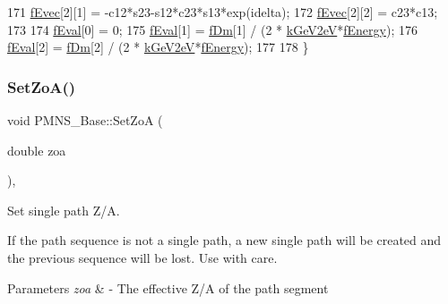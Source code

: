 \begin{DoxyCode}
171   \hyperlink{classOscProb_1_1PMNS__Base_a87be137356c5f27ab83cab5e1298ef8f}{fEvec}[2][1] = -c12*s23-s12*c23*s13*exp(idelta);
172   \hyperlink{classOscProb_1_1PMNS__Base_a87be137356c5f27ab83cab5e1298ef8f}{fEvec}[2][2] =  c23*c13;
173 
174   \hyperlink{classOscProb_1_1PMNS__Base_a6319c34d7decbb9d7d6da279c06e8c2d}{fEval}[0] = 0;
175   \hyperlink{classOscProb_1_1PMNS__Base_a6319c34d7decbb9d7d6da279c06e8c2d}{fEval}[1] = \hyperlink{classOscProb_1_1PMNS__Base_a406a31c3b5d620e5a0cace5b411f9f70}{fDm}[1] / (2 * \hyperlink{classOscProb_1_1PMNS__Base_ad36a0a6bf58d6ec093d3947784bd89e9}{kGeV2eV}*\hyperlink{classOscProb_1_1PMNS__Base_a2800af6d436972f3e900867790c046b0}{fEnergy});
176   \hyperlink{classOscProb_1_1PMNS__Base_a6319c34d7decbb9d7d6da279c06e8c2d}{fEval}[2] = \hyperlink{classOscProb_1_1PMNS__Base_a406a31c3b5d620e5a0cace5b411f9f70}{fDm}[2] / (2 * \hyperlink{classOscProb_1_1PMNS__Base_ad36a0a6bf58d6ec093d3947784bd89e9}{kGeV2eV}*\hyperlink{classOscProb_1_1PMNS__Base_a2800af6d436972f3e900867790c046b0}{fEnergy});
177 
178 \}
\end{DoxyCode}
\mbox{\label{classOscProb_1_1PMNS__Base_a1bf3ea8fd2507fd2fd82d7410ff8f578}} 
\subsubsection{\texorpdfstring{Set\+Zo\+A()}{SetZoA()}\hspace{0.1cm}{\footnotesize\ttfamily [1/2]}}
{\footnotesize\ttfamily void P\+M\+N\+S\+\_\+\+Base\+::\+Set\+ZoA (\begin{DoxyParamCaption}\item[{double}]{zoa }\end{DoxyParamCaption})\hspace{0.3cm}{\ttfamily [virtual]}, {\ttfamily [inherited]}}

Set single path Z/A.

If the path sequence is not a single path, a new single path will be created and the previous sequence will be lost. Use with care.


\begin{DoxyParams}{Parameters}
{\em zoa} & -\/ The effective Z/A of the path segment \\
\hline
\end{DoxyParams}


